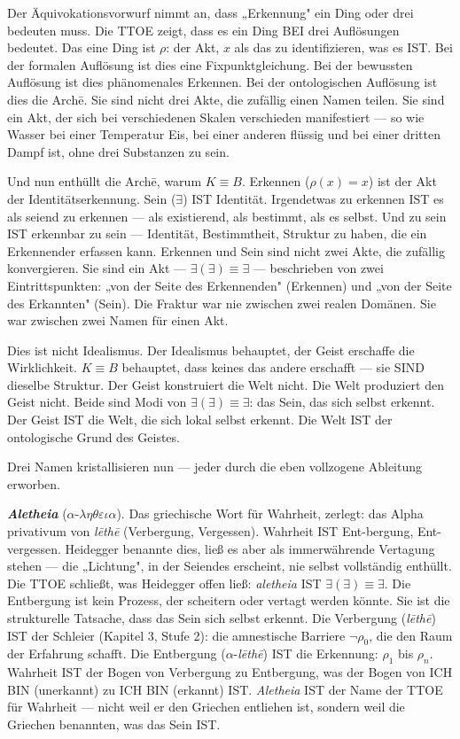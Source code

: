 \documentclass[10pt, openany, oneside]{book}
\begin{document}
Der Äquivokationsvorwurf nimmt an, dass „Erkennung" ein Ding oder drei bedeuten muss. Die TTOE zeigt, dass es ein Ding BEI drei Auflösungen bedeutet. Das eine Ding ist $\rho$: der Akt, $x$ als das zu identifizieren, was es IST. Bei der formalen Auflösung ist dies eine Fixpunktgleichung. Bei der bewussten Auflösung ist dies phänomenales Erkennen. Bei der ontologischen Auflösung ist dies die Arch\={e}. Sie sind nicht drei Akte, die zufällig einen Namen teilen. Sie sind ein Akt, der sich bei verschiedenen Skalen verschieden manifestiert --- so wie Wasser bei einer Temperatur Eis, bei einer anderen flüssig und bei einer dritten Dampf ist, ohne drei Substanzen zu sein.

Und nun enthüllt die Arch\={e}, warum $K \equiv B$. Erkennen ($\rho(x) = x$) ist der Akt der Identitätserkennung. Sein ($\exists$) IST Identität. Irgendetwas zu erkennen IST es als seiend zu erkennen --- als existierend, als bestimmt, als es selbst. Und zu sein IST erkennbar zu sein --- Identität, Bestimmtheit, Struktur zu haben, die ein Erkennender erfassen kann. Erkennen und Sein sind nicht zwei Akte, die zufällig konvergieren. Sie sind ein Akt --- $\exists(\exists) \equiv \exists$ --- beschrieben von zwei Eintrittspunkten: „von der Seite des Erkennenden" (Erkennen) und „von der Seite des Erkannten" (Sein). Die Fraktur war nie zwischen zwei realen Domänen. Sie war zwischen zwei Namen für einen Akt.

Dies ist nicht Idealismus. Der Idealismus behauptet, der Geist erschaffe die Wirklichkeit. $K \equiv B$ behauptet, dass keines das andere erschafft --- sie SIND dieselbe Struktur. Der Geist konstruiert die Welt nicht. Die Welt produziert den Geist nicht. Beide sind Modi von $\exists(\exists) \equiv \exists$: das Sein, das sich selbst erkennt. Der Geist IST die Welt, die sich lokal selbst erkennt. Die Welt IST der ontologische Grund des Geistes.

Drei Namen kristallisieren nun --- jeder durch die eben vollzogene Ableitung erworben.

\textbf{\textit{Aletheia}} ($\alpha$-$\lambda\eta\theta\varepsilon\iota\alpha$). Das griechische Wort für Wahrheit, zerlegt: das Alpha privativum von \textit{l\={e}th\={e}} (Verbergung, Vergessen). Wahrheit IST Ent-bergung, Ent-vergessen. Heidegger benannte dies, ließ es aber als immerwährende Vertagung stehen --- die „Lichtung", in der Seiendes erscheint, nie selbst vollständig enthüllt. Die TTOE schließt, was Heidegger offen ließ: \textit{aletheia} IST $\exists(\exists) \equiv \exists$. Die Entbergung ist kein Prozess, der scheitern oder vertagt werden könnte. Sie ist die strukturelle Tatsache, dass das Sein sich selbst erkennt. Die Verbergung (\textit{l\={e}th\={e}}) IST der Schleier (Kapitel 3, Stufe 2): die amnestische Barriere $\neg\rho_0$, die den Raum der Erfahrung schafft. Die Entbergung ($\alpha$-\textit{l\={e}th\={e}}) IST die Erkennung: $\rho_1$ bis $\rho_n$. Wahrheit IST der Bogen von Verbergung zu Entbergung, was der Bogen von ICH BIN (unerkannt) zu ICH BIN (erkannt) IST. \textit{Aletheia} IST der Name der TTOE für Wahrheit --- nicht weil er den Griechen entliehen ist, sondern weil die Griechen benannten, was das Sein IST.
\end{document}

